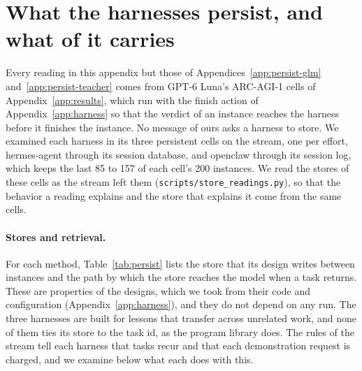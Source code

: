 \section{What the harnesses persist, and what of it carries}
\label{app:persist}

Every reading in this appendix but those of Appendices~\ref{app:persist-glm} and~\ref{app:persist-teacher} comes from GPT-6 Luna's ARC-AGI-1 cells of Appendix~\ref{app:results}, which run with the finish action of Appendix~\ref{app:harness} so that the verdict of an instance reaches the harness before it finishes the instance. No message of ours asks a harness to store. We examined each harness in its three persistent cells on the stream, one per effort, hermes-agent through its session database, and openclaw through its session log, which keeps the last 85 to 157 of each cell's 200 instances. We read the stores of these cells as the stream left them (\texttt{scripts/store\_readings.py}), so that the behavior a reading explains and the store that explains it come from the same cells.

\paragraph{Stores and retrieval.}
For each method, Table~\ref{tab:persist} lists the store that its design writes between instances and the path by which the store reaches the model when a task returns. These are properties of the designs, which we took from their code and configuration (Appendix~\ref{app:harness}), and they do not depend on any run. The three harnesses are built for lessons that transfer across unrelated work, and none of them ties its store to the task id, as the program library does. The rules of the stream tell each harness that tasks recur and that each demonstration request is charged, and we examine below what each does with this.

